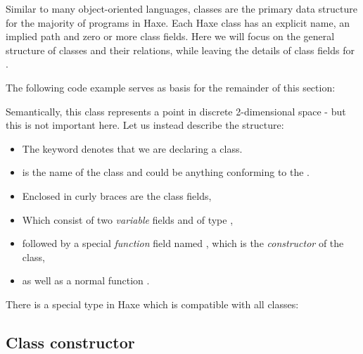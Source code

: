 Similar to many object-oriented languages, classes are the primary data structure for the majority of programs in Haxe. Each Haxe class has an explicit name, an implied path and zero or more class fields. Here we will focus on the general structure of classes and their relations, while leaving the details of class fields for .

The following code example serves as basis for the remainder of this section:


Semantically, this class represents a point in discrete 2-dimensional space - but this is not important here. Let us instead describe the structure:

\begin{itemize}
	\item The keyword  denotes that we are declaring a class.
	\item {} is the name of the class and could be anything conforming to the .
	\item Enclosed in curly braces \expr{$\left\{\right\}$} are the class fields,
	\item Which consist of two \emph{variable} fields  and  of type ,
	\item followed by a special \emph{function} field named , which is the \emph{constructor} of the class,
	\item as well as a normal function .
\end{itemize}
There is a special type in Haxe which is compatible with all classes:


\subsection{Class constructor}
\label{types-class-constructor}

